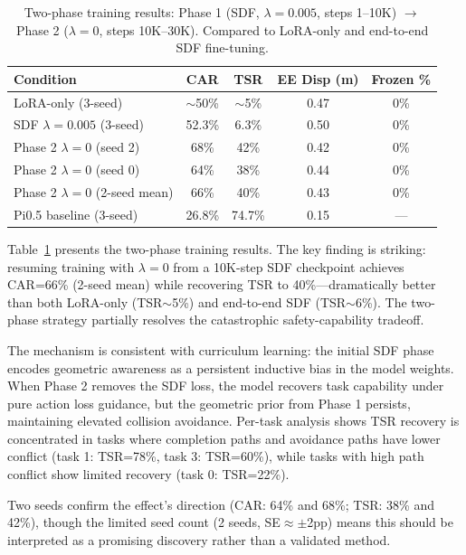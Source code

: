 \documentclass[letterpaper]{article}
\begin{document}
\begin{table}[t]
\centering
\caption{Two-phase training results: Phase 1 (SDF, $\lambda=0.005$, steps 1--10K) $\to$ Phase 2 ($\lambda=0$, steps 10K--30K). Compared to LoRA-only and end-to-end SDF fine-tuning.}
\label{tab:phase2}
\begin{tabular}{lcccc}
\toprule
\textbf{Condition} & \textbf{CAR} & \textbf{TSR} & \textbf{EE Disp (m)} & \textbf{Frozen \%} \\
\midrule
LoRA-only (3-seed) & $\sim$50\% & $\sim$5\% & 0.47 & 0\% \\
SDF $\lambda=0.005$ (3-seed) & 52.3\% & 6.3\% & 0.50 & 0\% \\
Phase 2 $\lambda=0$ (seed 2) & 68\% & 42\% & 0.42 & 0\% \\
Phase 2 $\lambda=0$ (seed 0) & 64\% & 38\% & 0.44 & 0\% \\
Phase 2 $\lambda=0$ (2-seed mean) & 66\% & 40\% & 0.43 & 0\% \\
Pi0.5 baseline (3-seed) & 26.8\% & 74.7\% & 0.15 & --- \\
\bottomrule
\end{tabular}
\end{table}

Table~\ref{tab:phase2} presents the two-phase training results. The key finding is striking: resuming training with $\lambda=0$ from a 10K-step SDF checkpoint achieves CAR=66\% (2-seed mean) while recovering TSR to 40\%---dramatically better than both LoRA-only (TSR$\sim$5\%) and end-to-end SDF (TSR$\sim$6\%). The two-phase strategy partially resolves the catastrophic safety-capability tradeoff.

The mechanism is consistent with curriculum learning: the initial SDF phase encodes geometric awareness as a persistent inductive bias in the model weights. When Phase 2 removes the SDF loss, the model recovers task capability under pure action loss guidance, but the geometric prior from Phase 1 persists, maintaining elevated collision avoidance. Per-task analysis shows TSR recovery is concentrated in tasks where completion paths and avoidance paths have lower conflict (task 1: TSR=78\%, task 3: TSR=60\%), while tasks with high path conflict show limited recovery (task 0: TSR=22\%).

Two seeds confirm the effect's direction (CAR: 64\% and 68\%; TSR: 38\% and 42\%), though the limited seed count (2 seeds, SE$\approx \pm$2pp) means this should be interpreted as a promising discovery rather than a validated method.


\end{document}
